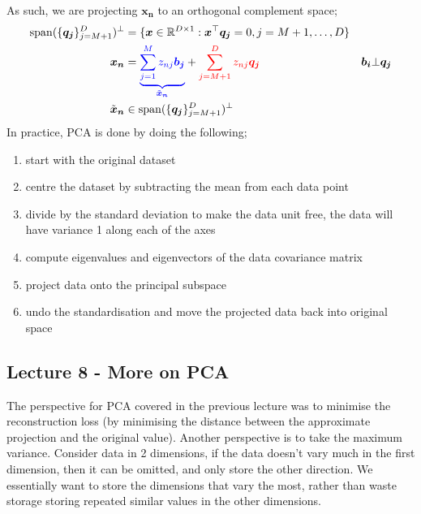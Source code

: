 \documentclass[a4paper, 12pt]{article}
\newcommand{\summation}[2]{\sum\limits_{#1}^{#2}}
\newcommand{\mat}[1]{\boldsymbol{#1}}
\renewcommand{\vec}[1]{\boldsymbol{#1}}
\newcommand{\mbbr}[0]{\mathbb{R}}
\newcommand{\blue}[1]{\textcolor{blue}{#1}}
\newcommand{\red}[1]{\textcolor{red}{#1}}
\begin{document}
                As such, we are projecting $\mat{x_n}$ to an orthogonal complement space;
                \begin{align*}
                    \mathrm{span}(\{ \mat{q_j} \}_{j = M + 1}^D)^\bot & = \{ \vec{x} \in \mbbr^{D \times 1} : \mat{x}^\top\mat{q_j} = 0, j = M + 1, \dots, D \} \\
                    \vec{x_n} & = \blue{\underbrace{\summation{j = 1}{M} z_{nj}\mat{b_j}}_{\tilde{\mat{x}}_{\mat{n}}}} + \red{\summation{j = M + 1}{D} z_{nj}\mat{q_j}} & \mat{b_i} \bot \mat{q_j} \\
                    \tilde{\mat{x}}_{\mat{n}} & \in \mathrm{span}(\{ \mat{q_j} \}_{j = M + 1}^D)^\bot
                \end{align*}
                In practice, PCA is done by doing the following;
                \begin{enumerate}[1.]
                    \itemsep0em
                    \item start with the original dataset
                    \item centre the dataset by subtracting the mean from each data point
                    \item divide by the standard deviation to make the data unit free, the data will have variance 1 along each of the axes
                    \item compute eigenvalues and eigenvectors of the data covariance matrix
                    \item project data onto the principal subspace
                    \item undo the standardisation and move the projected data back into original space
                \end{enumerate}
        \subsection*{Lecture 8 - More on PCA}
            The perspective for PCA covered in the previous lecture was to minimise the reconstruction loss (by minimising the distance between the approximate projection and the original value).
            Another perspective is to take the maximum variance.
            Consider data in 2 dimensions, if the data doesn't vary much in the first dimension, then it can be omitted, and only store the other direction.
            We essentially want to store the dimensions that vary the most, rather than waste storage storing repeated similar values in the other dimensions.
            \medskip
\end{document}
